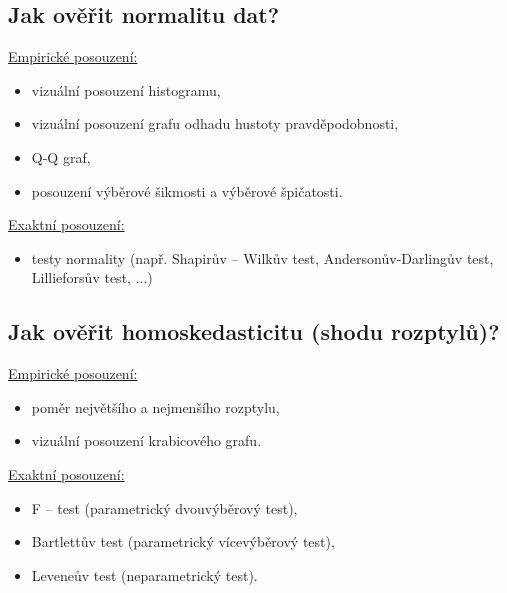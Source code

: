 \documentclass[a4paper,12pt]{article}
\begin{document}
\subsection*{Jak	ověřit	normalitu	dat?}
\ul{Empirické posouzení:}
\begin{itemize}
    \item vizuální posouzení histogramu,
    \item vizuální posouzení grafu odhadu hustoty pravděpodobnosti,
    \item Q-Q graf,
    \item posouzení výběrové šikmosti a výběrové špičatosti.
\end{itemize}
\ul{Exaktní posouzení:}
\begin{itemize}
    \item testy normality (např. Shapirův – Wilkův test, Andersonův-Darlingův test, Lillieforsův test, ...)
\end{itemize}




\subsection*{Jak	ověřit	homoskedasticitu	(shodu	rozptylů)?}
\ul{Empirické posouzení:}
\begin{itemize}
    \item poměr největšího a nejmenšího rozptylu,
    \item vizuální posouzení krabicového grafu.
\end{itemize}
\ul{Exaktní posouzení:}
\begin{itemize}
    \item F – test (parametrický dvouvýběrový test),
    \item Bartlettův test (parametrický vícevýběrový test),
    \item Leveneův test (neparametrický test).
\end{itemize}
\end{document}
